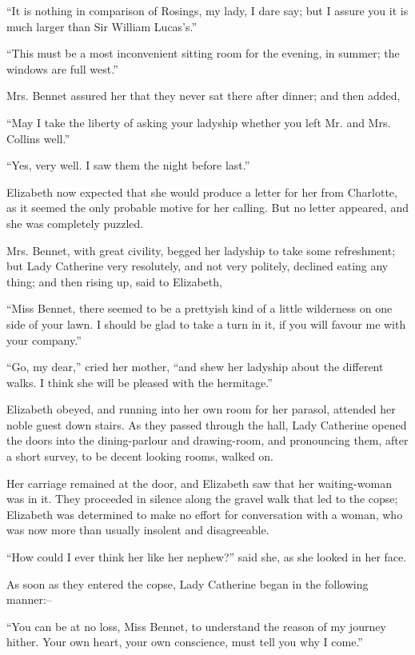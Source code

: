 “It is nothing in comparison of Rosings, my lady,
I dare say; but I assure you it is much larger than
Sir William Lucas’s.”

“This must be a most inconvenient sitting room for
the evening, in summer; the windows are full west.”

Mrs. Bennet assured her that they never sat there after
dinner; and then added,

“May I take the liberty of asking your ladyship
whether you left Mr. and Mrs. Collins well.”

“Yes, very well. I saw them the night before last.”

Elizabeth now expected that she would produce a letter
for her from Charlotte, as it seemed the only probable
motive for her calling. But no letter appeared, and she
was completely puzzled.

Mrs. Bennet, with great civility, begged her ladyship
to take some refreshment; but Lady Catherine very
resolutely, and not very politely, declined eating any
thing; and then rising up, said to Elizabeth,

“Miss Bennet, there seemed to be a prettyish kind of
a little wilderness on one side of your lawn. I should be
glad to take a turn in it, if you will favour me with your
company.”

“Go, my dear,” cried her mother, “and shew her
ladyship about the different walks. I think she will be
pleased with the hermitage.”

Elizabeth obeyed, and running into her own room for
her parasol, attended her noble guest down stairs. As
they passed through the hall, Lady Catherine opened the
doors into the dining-parlour and drawing-room, and
pronouncing them, after a short survey, to be decent
looking rooms, walked on.

Her carriage remained at the door, and Elizabeth saw
that her waiting-woman was in it. They proceeded in
silence along the gravel walk that led to the copse; Elizabeth
was determined to make no effort for conversation
with a woman, who was now more than usually insolent
and disagreeable.

“How could I ever think her like her nephew?” said
she, as she looked in her face.

As soon as they entered the copse, Lady Catherine began
in the following manner:--

“You can be at no loss, Miss Bennet, to understand the
reason of my journey hither. Your own heart, your own
conscience, must tell you why I come.”

